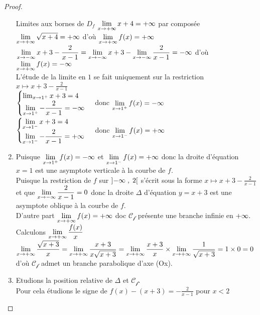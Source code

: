 \begin{proof}
\begin{enumerate}
 Limites aux bornes de $D_{f}  $
 $\displaystyle\lim_{x \to +\infty }x+4= +\infty $  par composée $\displaystyle\lim_{x \to +\infty}\sqrt{x+4}=+\infty  $ d'où $\displaystyle\lim_{x \to +\infty}f(x)=+\infty  $\\
 $\displaystyle\lim_{x \to -\infty}x+3-\frac{2}{x-1}=\displaystyle \lim_{x \to -\infty}x+3-\displaystyle\lim_{x \to -\infty}\frac{2}{x-1}=-\infty  $ d'où $\displaystyle\lim_{x \to +\infty}f(x)=-\infty  $\\
 L'étude de la limite en $ 1 $ se fait uniquement sur la restriction $ x \mapsto x+3-\frac{2}{x-1} $\\
$ \begin{cases}\lim_{x \to 1^{+}}x+3=4  \\ \displaystyle\lim_{x \to 1^{+}}-\frac{2}{x-1}=-\infty\end{cases}$  donc $\displaystyle\lim_{x \to 1^{+}}f(x)=-\infty  $\\
$ \begin{cases}\displaystyle\lim_{x \to 1^{-}}x+3=4  \\ \displaystyle\lim_{x \to 1^{-}}-\frac{2}{x-1}=+\infty\end{cases}$  donc $\displaystyle\lim_{x \to 1^{-}}f(x)=+\infty  $
\item Puisque $\displaystyle\lim_{x \to 1^{+}}f(x)=-\infty  $ et $\displaystyle\lim_{x \to 1^{-}}f(x)=+\infty  $ donc la droite d'équation $ x=1 $ est une asymptote verticale à la courbe de $ f. $\\
Puisque la restriction de $ f $ sur $ \left]-\infty \;,\; 2\right[ $ s'écrit sous la forme $ x \mapsto x+3-\frac{2}{x-1} $ et que $ \displaystyle\lim_{x \to -\infty}\frac{2}{x-1}= 0 $ donc la droite $ \Delta $ d'équation $ y=x+3 $ est une asymptote oblique à la courbe de $ f. $\\
D'autre part  $\displaystyle\lim_{x \to +\infty}f(x)=+\infty  $ doc $ \mathcal{C_{f}} $ présente une branche infinie en $ +\infty. $\\ Calculons $\displaystyle \lim_{x \to +\infty}\frac{f(x)}{x} $\\
$\displaystyle \lim_{x \to +\infty}\frac{\sqrt{x+3}}{x} = \displaystyle\lim_{x \to +\infty} \frac{x+3}{x\sqrt{x+3}}=\displaystyle\lim_{x \to +\infty} \frac{x+3}{x} \times \displaystyle\lim_{x \to +\infty}\frac{1}{\sqrt{x+3}}= 1 \times 0 =0 $ d'où $ \mathcal{C_{f}} $ admet un branche  parabolique d'axe (Ox).
\item Etudions la position relative de $ \Delta $ et $ \mathcal{C_{f}} $.\\
Pour cela étudions le signe de $ f(x)-(x+3) = -\frac{2}{x-1} $ pour $ x < 2 $  


\end{enumerate}
\end{proof}

